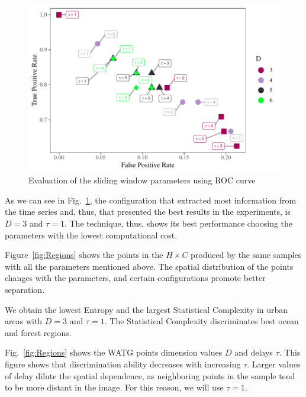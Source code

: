\documentclass[journal]{IEEEtran}
\begin{document}
	\begin{figure}[hbt]
		\includegraphics[width=\columnwidth]{Figures/ROC.pdf}
		\caption{Evaluation of the sliding window parameters using ROC curve}
		\label{fig:ROC}
	\end{figure} 
	
	As we can see in Fig.~\ref{fig:ROC}, the configuration that extracted most information from the time series and, thus, that presented the best results in the experiments, is $D = 3$ and $\tau = 1$.
	The technique, thus, shows its best performance choosing the parameters with the lowest computational cost.
	
	Figure~\ref{fig:Regions} shows the points in the $H\times C$ produced by the same samples with all the parameters mentioned above.
	The spatial distribution of the points changes with the parameters,
	and certain configurations promote better separation.
	
	We obtain the lowest Entropy and the largest Statistical Complexity
	in urban areas 	with $ D = 3 $ and $ \tau = 1 $.
	The Statistical Complexity discriminates best ocean and forest regions.
	
	Fig.~\ref{fig:Regions} shows the WATG points dimension values $D$ and delays $\tau$.
	This figure shows that discrimination ability decreases with increasing $\tau$.
	Larger values of delay dilute the spatial dependence, as neighboring points in the sample tend to be more distant in the image.
	For this reason, we will use $\tau=1$.
	
\end{document}
